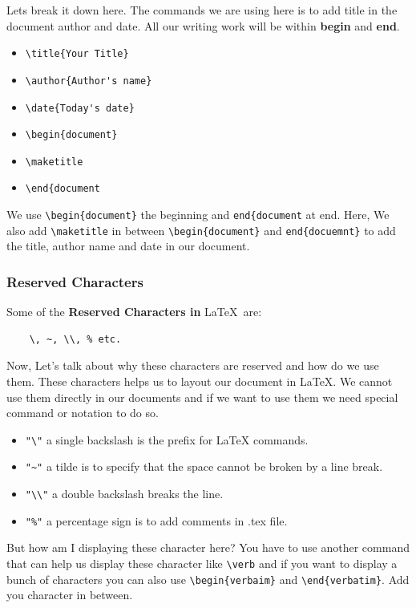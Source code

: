 \documentclass[12pt,journal,compsoc]{IEEEtran}
\begin{document}
Lets break it down here.
The commands we are using here is to add title in the document author and date. All our writing work will be within \textbf{begin} and \textbf{end}.
\begin{itemize}
    \item \verb|\title{Your Title}|
    \item \verb|\author{Author's name}|
    \item \verb|\date{Today's date}|
    \item \verb|\begin{document}| 
    \item \verb|\maketitle|
    \item \verb|\end{document|
\end{itemize}
We use \verb|\begin{document}| the beginning \-and \verb|end{document| at end.
Here, We also add \verb|\maketitle| in between \verb|\begin{document}| and \verb|end{docuemnt}| to add the title, author name and date in our document.

\subsubsection{Reserved Characters}
Some of the \textbf{Reserved Characters in} \LaTeX\  are:\begin{verbatim}
    \, ~, \\, % etc.
\end{verbatim}
Now, Let's talk about why these characters are reserved and how do we use them. These characters helps us to layout our document in LaTeX. We cannot use them directly in our documents and if we want to use them we need special command or notation to do so.
\begin{itemize}
    \item \verb|"\"| a single backslash is the prefix for LaTeX commands.
    \item \verb|"~"| a tilde is to specify that the space cannot be broken by a line break.
    \item \verb|"\\"| a double backslash breaks the line.
    \item \verb|"%"| a percentage sign is to add comments in .tex file.
\end{itemize}
But how am I displaying these character here?
You have to use another command that can help us display these character like \verb|\verb| and if you want to display a bunch of characters you can also use \verb|\begin{verbaim}| and \verb|\end{verbatim}|. Add you character in between. 
\end{document}
